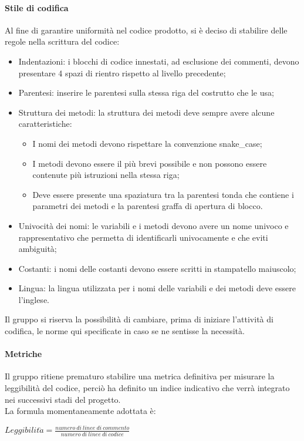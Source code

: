 \paragraph{Stile di codifica}
\label{par:stile_codifica}

Al fine di garantire uniformità nel codice prodotto, si è deciso di stabilire delle regole nella scrittura del codice:
\begin{itemize}
    \item Indentazioni: i blocchi di codice innestati, ad esclusione dei commenti, devono presentare 4 spazi di rientro 
    rispetto al livello precedente;
    \item Parentesi: inserire le parentesi sulla stessa riga del costrutto che le usa;
    \item Struttura dei metodi: la struttura dei metodi deve sempre avere alcune caratteristiche:
    \begin{itemize}
        \item I nomi dei metodi devono rispettare la convenzione snake\_case;
        \item I metodi devono essere il più brevi possibile e non possono essere contenute più istruzioni nella stessa 
        riga;
        \item Deve essere presente una spaziatura tra la parentesi tonda che contiene i parametri dei metodi e la 
        parentesi graffa di apertura di blocco.
    \end{itemize}
    \item Univocità dei nomi: le variabili e i metodi devono avere un nome univoco e rappresentativo che permetta di 
    identificarli univocamente e che eviti ambiguità;
    \item Costanti: i nomi delle costanti devono essere scritti in stampatello maiuscolo;
    \item Lingua: la lingua utilizzata per i nomi delle variabili e dei metodi deve essere l'inglese.
\end{itemize}
Il gruppo si riserva la possibilità di cambiare, prima di iniziare l'attività di codifica, le norme qui specificate in 
caso se ne sentisse la necessità.

\paragraph{Metriche}

Il gruppo ritiene prematuro stabilire una metrica definitiva per misurare la leggibilità del codice, perciò ha definito 
un indice indicativo che verrà integrato nei successivi stadi del progetto.\\
La formula momentaneamente adottata è:
\begin{center}
    $Leggibilit\grave{a} = \frac{numero\ di\ linee\ di\ commento}{numero\ di\ linee\ di\ codice}$
\end{center}

